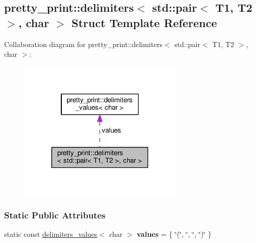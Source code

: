 \hypertarget{structpretty__print_1_1delimiters_3_01std_1_1pair_3_01T1_00_01T2_01_4_00_01char_01_4}{}\subsection{pretty\+\_\+print\+:\+:delimiters$<$ std\+:\+:pair$<$ T1, T2 $>$, char $>$ Struct Template Reference}
\label{structpretty__print_1_1delimiters_3_01std_1_1pair_3_01T1_00_01T2_01_4_00_01char_01_4}


Collaboration diagram for pretty\+\_\+print\+:\+:delimiters$<$ std\+:\+:pair$<$ T1, T2 $>$, char $>$\+:\nopagebreak
\begin{figure}[H]
\begin{center}
\leavevmode
\includegraphics[width=221pt]{structpretty__print_1_1delimiters_3_01std_1_1pair_3_01T1_00_01T2_01_4_00_01char_01_4__coll__graph}
\end{center}
\end{figure}
\subsubsection*{Static Public Attributes}
\begin{DoxyCompactItemize}
\item 
static const \hyperlink{structpretty__print_1_1delimiters__values}{delimiters\+\_\+values}$<$ char $>$ {\bfseries values} = \{ \char`\"{}(\char`\"{}, \char`\"{}, \char`\"{}, \char`\"{})\char`\"{} \}\hypertarget{structpretty__print_1_1delimiters_3_01std_1_1pair_3_01T1_00_01T2_01_4_00_01char_01_4_a5e1e43a6d103b3cea1af27c53cb9babd}{}\label{structpretty__print_1_1delimiters_3_01std_1_1pair_3_01T1_00_01T2_01_4_00_01char_01_4_a5e1e43a6d103b3cea1af27c53cb9babd}

\end{DoxyCompactItemize}


